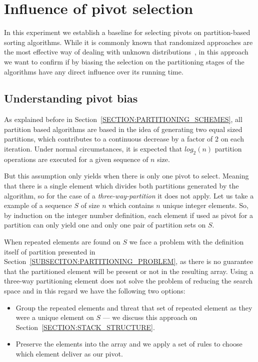 \section{Influence of pivot selection}

In this experiment we establish a baseline for selecting pivots on partition-based sorting algorithms. While it is commonly known that randomized approaches are the most effective way of dealing with unknown distributions~\cite{estivil92}, in this approach we want to confirm if by biasing the selection on the partitioning stages of the algorithms have any direct influence over its running time.

\subsection{Understanding pivot bias}

As explained before in Section~\ref{SECTION:PARTITIONING_SCHEMES}, all partition based algorithms are based in the idea of generating two equal sized partitions, which contributes to a continuous decrease by a factor of 2 on each iteration. Under normal circumstances, it is expected that $log_2(n)$ partition operations are executed for a given sequence of $n$ size.

But this assumption only yields when there is only one pivot to select. Meaning that there is a single element which divides both partitions generated by the algorithm, so for the case of a \emph{three-way-partition} it does not apply. Let us take a example of a sequence $S$ of size $n$ which contains $n$ unique integer elements. So, by induction on the integer number definition, each element if used as pivot for a partition can only yield one and only one pair of partition sets on $S$.

When repeated elements are found on $S$ we face a problem with the definition itself of partition presented in Section~\ref{SUBSECITON:PARTITIONING_PROBLEM}, as there is no guarantee that the partitioned element will be present or not in the resulting array. Using a three-way partitioning element does not solve the problem of reducing the search space and in this regard we have the following two options:

\begin{itemize}
    \item Group the repeated elements and threat that set of repeated element as they were a unique element on $S$ --- we discuss this approach on Section~\ref{SECTION:STACK_STRUCTURE}.
    \item Preserve the elements into the array and we apply a set of rules to choose which element deliver as our pivot.
\end{itemize}

